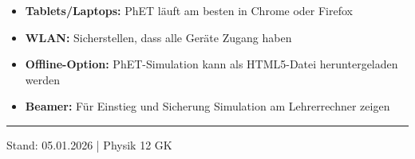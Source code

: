 \documentclass[11pt,a4paper]{article}
\begin{document}
\begin{itemize}[nosep]
\item \textbf{Tablets/Laptops:} PhET läuft am besten in Chrome oder Firefox
\item \textbf{WLAN:} Sicherstellen, dass alle Geräte Zugang haben
\item \textbf{Offline-Option:} PhET-Simulation kann als HTML5-Datei heruntergeladen werden
\item \textbf{Beamer:} Für Einstieg und Sicherung Simulation am Lehrerrechner zeigen
\end{itemize}

\vspace{1em}

\hrule
\vspace{0.3em}
\begin{center}
\small Stand: 05.01.2026 | Physik 12 GK
\end{center}
\end{document}
